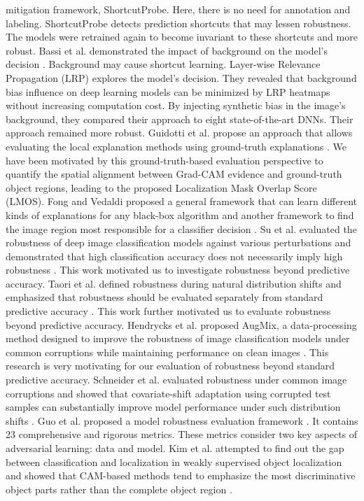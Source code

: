 \documentclass[a4paper,fleqn]{cas-dc}
\begin{document}
mitigation framework, ShortcutProbe\cite{r26}. Here, there is no need for annotation and labeling. ShortcutProbe detects prediction shortcuts that may lessen robustness. The models were retrained again to become invariant to these shortcuts and more robust. Bassi et al. demonstrated the impact of background on the model's decision \cite {r9}. Background may cause shortcut learning. Layer-wise Relevance Propagation (LRP) explores the model's decision. They revealed that background bias influence on deep learning models can be minimized by LRP heatmaps without increasing computation cost. By injecting synthetic bias in the image's background, they compared their approach to eight state-of-the-art DNNs. Their approach remained more robust. Guidotti et al. propose an approach that allows evaluating the local explanation methods using ground-truth explanations \cite{r27}. We have been motivated by this ground-truth-based evaluation perspective to quantify the spatial alignment between Grad-CAM evidence and ground-truth object regions, leading to the proposed Localization Mask Overlap Score (LMOS). Fong and Vedaldi proposed a general framework that can learn different kinds of explanations for any black-box algorithm and another framework to find the image region most responsible for a classifier decision \cite{r28}. Su et al. evaluated the robustness of deep image classification models against various perturbations and demonstrated that high classification accuracy does not necessarily imply high robustness \cite{r29}. This work motivated us to investigate robustness beyond predictive accuracy. Taori et al. defined robustness during natural distribution shifts and emphasized that robustness should be evaluated separately from standard predictive accuracy \cite{r30}. This work further motivated us to evaluate robustness beyond predictive accuracy. Hendrycks et al. proposed AugMix, a data-processing method designed to improve the robustness of image classification models under common corruptions while maintaining performance on clean images \cite{r31}. This research is very motivating for our evaluation of robustness beyond standard predictive accuracy. Schneider et al. evaluated robustness under common image corruptions and showed that covariate-shift adaptation using corrupted test samples can substantially improve model performance under such distribution shifts \cite{r32}. Guo et al. proposed a model robustness evaluation framework \cite{r33}. It contains 23 comprehensive and rigorous metrics. These metrics consider two key aspects of adversarial learning: data and model. Kim et al. attempted to find out the gap between classification and localization in weakly supervised object localization and showed that CAM-based methods tend to emphasize the most discriminative object parts rather than the complete object region \cite{r34}.
\end{document}
